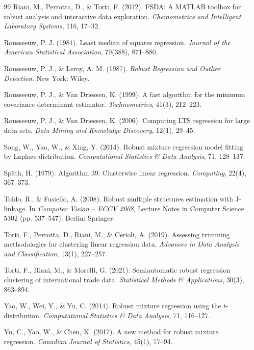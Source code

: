\begin{thebibliography}{99}
 Riani, M., Perrotta, D., \& Torti, F. (2012). FSDA: A MATLAB toolbox for robust analysis and interactive data exploration. \textit{Chemometrics and Intelligent Laboratory Systems}, 116, 17--32.

 Rousseeuw, P. J. (1984). Least median of squares
regression. \textit{Journal of the American Statistical Association}, 79(388), 871--880.

 Rousseeuw, P. J., \& Leroy, A. M.
(1987). \textit{Robust Regression and Outlier Detection}. New York: Wiley.

 Rousseeuw, P. J., \& Van Driessen, K. (1999). A fast algorithm for the minimum covariance determinant estimator. \textit{Technometrics}, 41(3), 212--223.

 Rousseeuw, P. J., \& Van
Driessen, K. (2006). Computing LTS regression for large data sets. \textit{Data Mining and
Knowledge Discovery}, 12(1), 29--45.

 Song, W., Yao, W., \& Xing, Y. (2014). Robust mixture regression model fitting by Laplace distribution. \textit{Computational Statistics \& Data Analysis}, 71, 128--137.

 Sp\"ath, H. (1979). Algorithm 39: Clusterwise
linear regression. \textit{Computing}, 22(4), 367--373.

 Toldo, R., \& Fusiello, A. (2008). Robust multiple structures estimation with J-linkage. In \textit{Computer Vision -- ECCV 2008}, Lecture Notes in Computer Science 5302 (pp. 537--547). Berlin: Springer.

 Torti, F., Perrotta, D., Riani, M., \& Cerioli, A. (2019). Assessing trimming methodologies for clustering linear regression data. \textit{Advances in Data Analysis and Classification}, 13(1), 227--257.

 Torti, F., Riani, M., \& Morelli, G. (2021). Semiautomatic robust regression clustering of international trade data. \textit{Statistical Methods \& Applications}, 30(3), 863--894.

 Yao, W., Wei, Y., \& Yu, C. (2014). Robust mixture regression using the $t$-distribution. \textit{Computational Statistics \& Data Analysis}, 71, 116--127.

 Yu, C., Yao, W., \& Chen, K. (2017). A new method for robust mixture regression. \textit{Canadian Journal of Statistics}, 45(1), 77--94.
\end{thebibliography}
